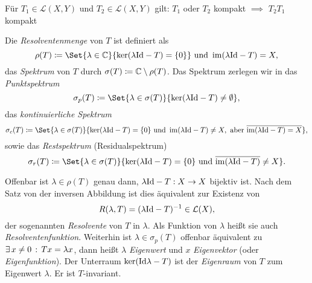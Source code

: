 \documentclass{cheat-sheet}
\begin{document}

\begin{lem}
  Für $T_1 \in \mathcal{L}(X, Y)$ und $T_2 \in \mathcal{L}(X, Y)$ gilt:
  $T_1$ oder $T_2$ kompakt $\implies$ $T_2 T_1$ kompakt
\end{lem}

\iffalse
\begin{bspe}
  \begin{itemize}
    \item Sei $\Omega \opn \R^n$, beschränkt mit $\mathcal{C}^{0,1}$-Rand. Seien $m_1 > m_2 \in \N$ und $1 \leq p_1, p_2 < \infty$ sowie $m_1 - \tfrac{n}{p_1} > m_2 - \tfrac{n}{p_2}$. Dann ist die Einbettung $\Id : W^{m_1,p_1}(\Omega) \to W^{m_2,p_2}(\Omega)$ stetig und kompakt.
    \item Viele Integraloperatoren, vgl. z.\,B. ÜA24
  \end{itemize}
\end{bspe}
\fi



\begin{definition}
  Die \emph{Resolventenmenge} von $T$ ist definiert als
  \[ \rho(T) \coloneqq \Set{ \lambda \in \C }{ \ker (\lambda \Id - T) = \{ 0 \} } \text{ und } \im (\lambda \Id - T) = X, \]
  das \emph{Spektrum} von $T$ durch $\sigma(T) \coloneqq \mathbb{C} \setminus \rho(T)$. Das Spektrum zerlegen wir in das \emph{Punktspektrum}
  \[ \sigma_p(T) \coloneqq \Set{ \lambda \in \sigma(T) }{ \ker(\lambda \Id - T) \not= \emptyset }, \]
  das \emph{kontinuierliche Spektrum}
  \[ \sigma_c(T) \coloneqq \Set{ \lambda \in \sigma(T) }{ \ker(\lambda \Id - T) = \{ 0 \} \text{ und } \im (\lambda \Id - T) \not= X, \text{ aber } \overline{\im (\lambda \Id - T) = X } }, \]
  sowie das \emph{Restspektrum} (Residualspektrum)
  \[ \sigma_r(T) \coloneqq \Set{ \lambda \in \sigma(T) }{ \ker(\lambda \Id - T) = \{ 0 \} \text{ und } \overline{\im(\lambda \Id - T)} \not= X }. \]
\end{definition}

Offenbar ist $\lambda \in \rho(T)$ genau dann, $\lambda \mathrm{Id} - T : X \to X$ bijektiv ist. Nach dem Satz von der inversen Abbildung ist dies äquivalent zur Existenz von
\[ R(\lambda, T) = (\lambda \mathrm{Id} - T)^{-1} \in \mathcal{L}(X), \]
der sogenannten \emph{Resolvente} von $T$ in $\lambda$. Als Funktion von $\lambda$ heißt sie auch \emph{Resolventenfunktion}. Weiterhin ist $\lambda \in \sigma_p(T)$ offenbar äquivalent zu $\exists \, {x \not= 0} \,:\, Tx = \lambda x$, dann heißt $\lambda$ \emph{Eigenwert} und $x$ \emph{Eigenvektor} (oder \emph{Eigenfunktion}). Der Unterraum $\ker(\mathrm{Id} \lambda - T)$ ist der \emph{Eigenraum} von $T$ zum Eigenwert $\lambda$. Er ist $T$-invariant.
\end{document}
